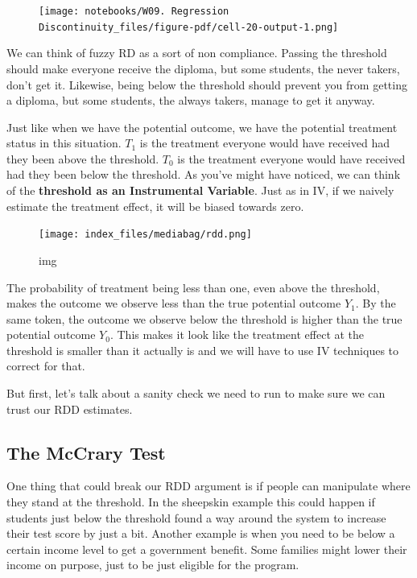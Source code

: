 \documentclass[
  letterpaper,
  DIV=11,
  numbers=noendperiod]{scrreprt}
\begin{document}
\begin{figure}[H]

{\centering \texttt{[image: notebooks/W09. Regression Discontinuity\_files/figure-pdf/cell-20-output-1.png]}

}

\end{figure}

We can think of fuzzy RD as a sort of non compliance. Passing the
threshold should make everyone receive the diploma, but some students,
the never takers, don't get it. Likewise, being below the threshold
should prevent you from getting a diploma, but some students, the always
takers, manage to get it anyway.

Just like when we have the potential outcome, we have the potential
treatment status in this situation. \(T_1\) is the treatment everyone
would have received had they been above the threshold. \(T_0\) is the
treatment everyone would have received had they been below the
threshold. As you've might have noticed, we can think of the
\textbf{threshold as an Instrumental Variable}. Just as in IV, if we
naively estimate the treatment effect, it will be biased towards zero.

\begin{figure}

{\centering \texttt{[image: index\_files/mediabag/rdd.png]}

}

\caption{img}

\end{figure}

The probability of treatment being less than one, even above the
threshold, makes the outcome we observe less than the true potential
outcome \(Y_1\). By the same token, the outcome we observe below the
threshold is higher than the true potential outcome \(Y_0\). This makes
it look like the treatment effect at the threshold is smaller than it
actually is and we will have to use IV techniques to correct for that.

But first, let's talk about a sanity check we need to run to make sure
we can trust our RDD estimates.

\hypertarget{the-mccrary-test}{%
\subsection{The McCrary Test}\label{the-mccrary-test}}

One thing that could break our RDD argument is if people can manipulate
where they stand at the threshold. In the sheepskin example this could
happen if students just below the threshold found a way around the
system to increase their test score by just a bit. Another example is
when you need to be below a certain income level to get a government
benefit. Some families might lower their income on purpose, just to be
just eligible for the program.
\end{document}
